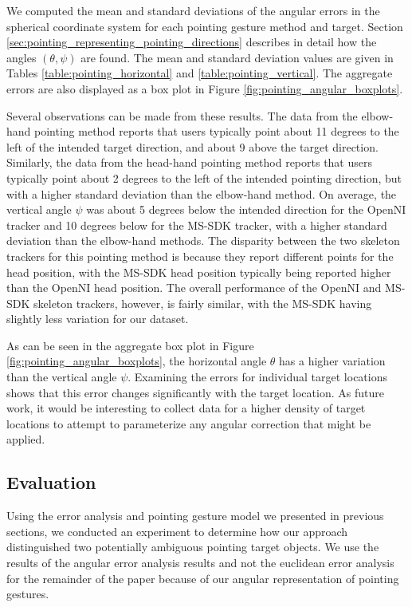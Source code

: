 We computed the mean and standard deviations of the angular errors in the spherical coordinate system for each pointing gesture method and target. Section \ref{sec:pointing_representing_pointing_directions} describes in detail how the angles $(\theta, \psi)$ are found. The mean and standard deviation values are given in Tables \ref{table:pointing_horizontal} and \ref{table:pointing_vertical}.  The aggregate errors are also displayed as a  box plot in Figure \ref{fig:pointing_angular_boxplots}.

Several observations can be made from these results. The data from the elbow-hand pointing method reports that users typically point about 11 degrees to the left of the intended target direction, and about 9 above the target direction. Similarly, the data from the head-hand pointing method reports that users typically point about 2 degrees to the left of the intended pointing direction, but with a higher standard deviation than the elbow-hand method.  On average, the vertical angle $\psi$ was about 5 degrees below the intended direction for the OpenNI tracker and 10 degrees below for the MS-SDK tracker, with a higher standard deviation than the elbow-hand methods.  The disparity between the two skeleton trackers for this pointing method is because they report different points for the head position, with the MS-SDK head position typically being reported higher than the OpenNI head position. The overall performance of the OpenNI and MS-SDK skeleton trackers, however, is fairly similar, with the MS-SDK having slightly less variation for our dataset.

As can be seen in the aggregate box plot in Figure \ref{fig:pointing_angular_boxplots}, the horizontal angle $\theta$ has a higher variation than the vertical angle $\psi$.  Examining the errors for individual target locations shows that this error changes significantly with the target location.  As future work, it would be interesting to collect data for a higher density of target locations to attempt to parameterize any angular correction that might be applied.

\subsection{Evaluation}
\label{sec:pointing_evaluation}

Using the error analysis and pointing gesture model we presented in previous sections, we conducted an experiment to  determine how our approach distinguished two potentially ambiguous pointing target objects. We use the results of the angular error analysis results and not the euclidean error analysis for the remainder of the paper because of our angular representation of pointing gestures.


